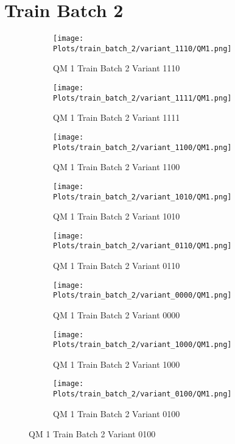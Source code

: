 \documentclass{DissertateFigs}
\begin{document}
\section{Train Batch 2}
\begin{figure}[t!]
    \begin{subfigure}{0.47\textwidth}
    \texttt{[image: Plots/train\_batch\_2/variant\_1110/QM1.png]}
    \caption{QM 1 Train Batch 2 Variant 1110}
    \end{subfigure}
    \begin{subfigure}{0.47\textwidth}
    \texttt{[image: Plots/train\_batch\_2/variant\_1111/QM1.png]}
    \caption{QM 1 Train Batch 2 Variant 1111}
    \end{subfigure}

\medskip

    \begin{subfigure}{0.47\textwidth}
    \texttt{[image: Plots/train\_batch\_2/variant\_1100/QM1.png]}
    \caption{QM 1 Train Batch 2 Variant 1100}
    \end{subfigure}
    \begin{subfigure}{0.47\textwidth}
    \texttt{[image: Plots/train\_batch\_2/variant\_1010/QM1.png]}
    \caption{QM 1 Train Batch 2 Variant 1010}
    \end{subfigure}

\medskip

    \begin{subfigure}{0.47\textwidth}
    \texttt{[image: Plots/train\_batch\_2/variant\_0110/QM1.png]}
    \caption{QM 1 Train Batch 2 Variant 0110}
    \end{subfigure}
    \begin{subfigure}{0.47\textwidth}
    \texttt{[image: Plots/train\_batch\_2/variant\_0000/QM1.png]}
    \caption{QM 1 Train Batch 2 Variant 0000}
    \end{subfigure}

\medskip

    \begin{subfigure}{0.47\textwidth}
    \texttt{[image: Plots/train\_batch\_2/variant\_1000/QM1.png]}
    \caption{QM 1 Train Batch 2 Variant 1000}
    \end{subfigure}
    \begin{subfigure}{0.47\textwidth}
    \texttt{[image: Plots/train\_batch\_2/variant\_0100/QM1.png]}
    \caption{QM 1 Train Batch 2 Variant 0100}
    \end{subfigure}


\end{figure}
\end{document}
